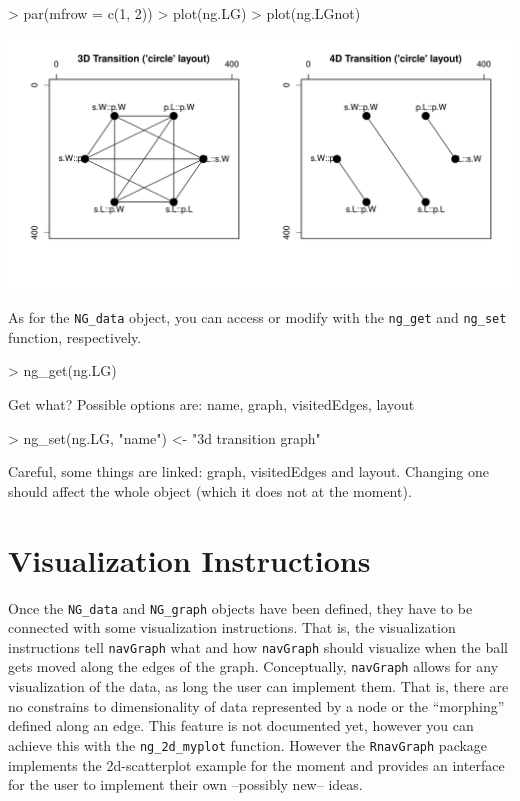 \documentclass[12pt,oneside,titlepage,letter]{article}
\newcommand{\modify}[1]{{\color{blue}#1}}
\begin{document}
\begin{center}
\begin{Schunk}
\begin{Sinput}
> par(mfrow = c(1, 2))
> plot(ng.LG)
> plot(ng.LGnot)
\end{Sinput}
\end{Schunk}
\includegraphics{sweave_p-045}
\end{center}

As for the \texttt{NG\_data} object, you can access or modify with the \texttt{ng\_get} and \texttt{ng\_set} function, respectively.
\begin{Schunk}
\begin{Sinput}
> ng_get(ng.LG)
\end{Sinput}
\begin{Soutput}
Get what? Possible options are: name, graph, visitedEdges, layout
\end{Soutput}
\begin{Sinput}
> ng_set(ng.LG, "name") <- "3d transition graph"
\end{Sinput}
\end{Schunk}
\modify{Careful, some things are linked: graph, visitedEdges and layout. Changing one should affect the whole object (which it does not at the moment)}.

\section{Visualization Instructions}
Once the \texttt{NG\_data} and \texttt{NG\_graph} objects have been defined, they have to be connected with some visualization instructions. That is, the visualization instructions tell \texttt{navGraph} what and how \texttt{navGraph} should visualize when the ball gets moved along the edges of the graph. Conceptually, \texttt{navGraph} allows for any visualization of the data, as long the user can implement them. That is, there are no constrains to dimensionality of data represented by a node or the ``morphing'' defined along an edge. \modify{This feature is not documented yet, however you can achieve this with the \texttt{ng\_2d\_myplot} function}. However the \texttt{RnavGraph} package implements the 2d-scatterplot example \modify{for the moment} and provides an interface for the user to implement their own --possibly new-- ideas.\\
\end{document}

